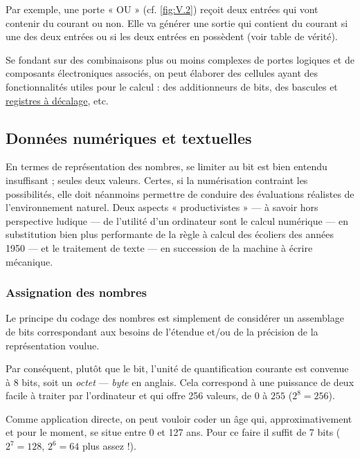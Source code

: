 Par exemple, une porte « OU » (cf. \cref{fig:V.2}) reçoit deux entrées qui vont contenir du courant ou non. Elle va générer une sortie qui contient du courant si une des deux entrées ou si les deux entrées en possèdent (voir table de vérité). 

Se fondant sur des combinaisons plus ou moins complexes de por\-tes logiques et de composants électroniques associés, on peut élaborer des cellules ayant des fonctionnalités utiles pour le calcul : des additionneurs de bits, des bascules et \href{https://fr.wikipedia.org/wiki/Registre\_\%C3\%A0\_d\%C3\%A9calage}{registres à décalage}, etc.

\subsection[Nombre et texte]{Données numériques et textuelles}
\label{sub:V.1.2}

En termes de représentation des nombres, se limiter au bit est bien entendu insuffisant ; seules deux valeurs. Certes, si la numérisation con\-traint les possibilités, \pagebreak elle doit néanmoins permettre de conduire des évaluations réalistes de l'environnement naturel. Deux aspects « productivistes » --- à savoir hors perspective ludique --- de l'utilité d'un ordinateur sont le calcul numérique --- en substitution bien plus performante de la règle à calcul des écoliers des années 1950 --- et le traitement de texte --- en succession de la machine à écrire mécanique.


\subsubsection[Assignation des nombres]{Assignation des nombres}
\label{subsub:V.1.2.1}

Le principe du codage des nombres est simplement de considérer un assemblage de bits correspondant aux besoins de l'étendue et/ou de la précision de la représentation voulue.

Par conséquent, plutôt que le bit, l'unité de quantification courante est convenue à 8 bits, soit un \emph{octet} --- \textit{byte} en anglais. Cela correspond à une puissance de deux facile à traiter par l'ordinateur et qui offre 256 valeurs, de $0$ à $255$ ($2^8 = 256$).

Comme application directe, on peut vouloir coder un âge qui, approximativement et pour le moment, se situe entre 0 et 127 ans. Pour ce faire il suffit de 7 bits ($2^7 = 128$, $2^6 = 64$ plus assez !).


